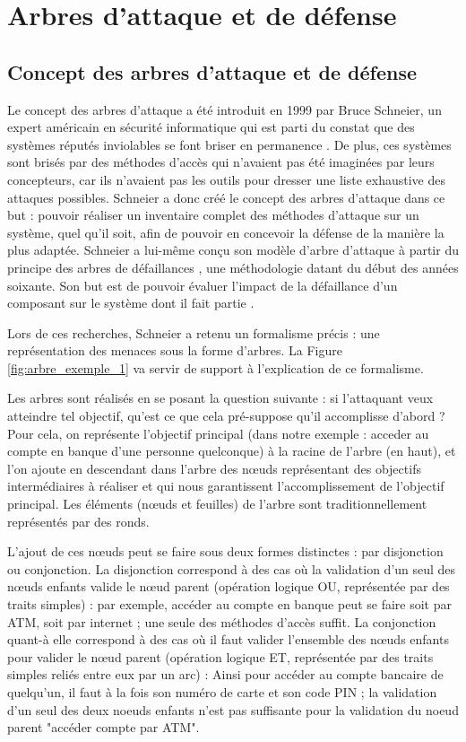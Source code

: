 \section{Arbres d'attaque et de défense}
	\label{sec:etat_art}

    \subsection{Concept des arbres d'attaque et de défense}
        Le concept des arbres d'attaque a été introduit en 1999 par Bruce Schneier, un expert américain en sécurité informatique qui est parti du constat que des systèmes réputés \og inviolables \fg se font briser en permanence \cite{doc_Schneier}. De plus, ces systèmes sont brisés par des méthodes d'accès qui n'avaient pas été imaginées par leurs concepteurs, car ils n'avaient pas les outils pour dresser une liste exhaustive des attaques possibles. Schneier a donc créé le concept des arbres d'attaque dans ce but : pouvoir réaliser un inventaire complet des méthodes d'attaque sur un système, quel qu'il soit, afin de pouvoir en concevoir la défense de la manière la plus adaptée. Schneier a lui-même conçu son modèle d'arbre d'attaque à partir du principe des \og arbres de défaillances \fg, une méthodologie datant du début des années soixante. Son but est de pouvoir évaluer l'impact de la défaillance d'un composant sur le système dont il fait partie \cite{defaillanceTree}.

		Lors de ces recherches, Schneier a retenu un formalisme précis : une représentation des menaces sous la forme d'arbres. La Figure \ref{fig:arbre_exemple_1} va servir de support à l'explication de ce formalisme.

        Les arbres sont réalisés en se posant la question suivante : si l'attaquant veux atteindre tel objectif, qu'est ce que cela pré-suppose qu'il accomplisse d'abord ? Pour cela, on représente l'objectif principal (dans notre exemple : acceder au compte en banque d'une personne quelconque) à la racine de l'arbre (en haut), et l'on ajoute en descendant dans l'arbre des nœuds représentant des objectifs intermédiaires à réaliser et qui nous garantissent l'accomplissement de l'objectif principal. Les éléments (nœuds et feuilles) de l'arbre sont traditionnellement représentés par des ronds. 

        L'ajout de ces nœuds peut se faire sous deux formes distinctes : par disjonction ou conjonction. La disjonction correspond à des cas où la validation d'un seul des nœuds enfants valide le nœud parent (opération logique OU, représentée par des traits simples) : par exemple, accéder au compte en banque peut se faire soit par ATM, soit par internet ; une seule des méthodes d'accès suffit. La conjonction quant-à elle correspond à des cas où il faut valider l'ensemble des nœuds enfants pour valider le nœud parent (opération logique ET, représentée par des traits simples reliés entre eux par un arc) : Ainsi pour accéder au compte bancaire de quelqu'un, il faut à la fois son numéro de carte et son code PIN ; la validation d'un seul des deux noeuds enfants n'est pas suffisante pour la validation du noeud parent "accéder compte par ATM". 

